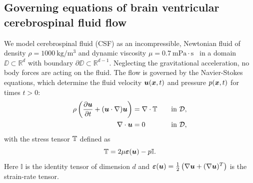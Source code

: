 \documentclass{template}
\begin{document}
\subsection{Governing equations of brain ventricular cerebrospinal fluid flow}
We model cerebrospinal fluid (CSF) as an incompressible, Newtonian fluid of density
$\rho=1000 \ \mathrm{kg/m^3}$ and dynamic viscosity
$\mu=0.7 \ \mathrm{mPa\cdot s}$~\citep{Bloomfield1998EffectsFluid}
in a domain $\DD\subset\mathbb{R}^d$
with boundary $\partial\DD\subset\mathbb{R}^{d-1}$.
Neglecting the gravitational acceleration, no body forces are acting on the fluid.
The flow is governed by the Navier-Stokes equations, which determine the
fluid velocity $\bm{u}(\bm{x}, t)$ and pressure $p(\bm{x}, t)$ for times $t > 0$:
\begin{alignat}{2}
    \rho\left(\frac{\partial \bm{u}}{\partial t}
    + (\bm{u}\cdot\nabla)\bm{u}\right) &= \nabla\cdot\mathbb{T} \quad&&\text{in }\mathcal{D},
    \label{eq:navier_stokes_mom_eq} \\
    \nabla\cdot\bm{u} &= 0 \quad&&\text{in }\mathcal{D},
    \label{eq:continuity_eq}
\end{alignat}
with the stress tensor $\mathbb{T}$ defined as
\begin{equation*}
    \mathbb{T} = 2\mu\bm{\varepsilon}(\bm{u}) - p\mathbb{I}.
\end{equation*}
Here $\mathbb{I}$ is the identity tensor of dimension $d$ and
$\bm{\varepsilon}(\bm{u})=\frac{1}{2}\left(\nabla\bm{u} + (\nabla\bm{u})^T\right)$ is the
strain-rate tensor.
\end{document}
